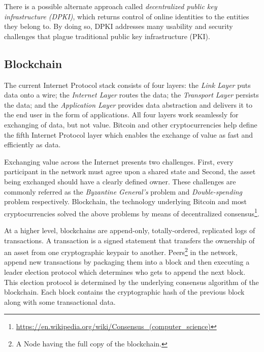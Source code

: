There is a possible alternate approach called \textit{decentralized public key infrastructure (DPKI)}, which returns control of online identities to the entities they belong to. By doing so, DPKI addresses many usability and security challenges that plague traditional public key infrastructure (PKI)\cite{allen2015decentralized}.

\subsection{Blockchain}
The current Internet Protocol stack consists of four layers: the \textit{Link Layer} puts data onto a wire; the \textit{Internet Layer} routes the data; the \textit{Transport Layer} persists the data; and the \textit{Application Layer} provides data abstraction and delivers it to the end user in the form of applications. All four layers work seamlessly for exchanging of data, but not value. Bitcoin\cite{nakamoto2008bitcoin} and other cryptocurrencies help define the fifth Internet Protocol layer which enables the exchange of value as fast and efficiently as data\cite{raval2016decentralized}.

Exchanging value across the Internet presents two challenges. First, every participant in the network must agree upon a shared state and Second, the asset being exchanged should have a clearly defined owner. These challenges are commonly referred as the \textit{Byzantine General's} problem\cite{lamport1982byzantine} and \textit{Double-spending} problem\cite{chohan2017double} respectively. Blockchain, the technology underlying Bitcoin and most cryptocurrencies solved the above problems by means of decentralized consensus\footnote{\url{https://en.wikipedia.org/wiki/Consensus_(computer_science)}}.

At a higher level, blockchains are append-only, totally-ordered, replicated logs of transactions\cite{bonneau2015research}. A transaction is a signed statement that transfers the ownership of an asset from one cryptographic keypair to another. Peers\footnote{A Node having the full copy of the blockchain.} in the network, append new transactions by packaging them into a block and then executing a leader election protocol which determines who gets to append the next block\cite{nelson2016extending}. This election protocol is determined by the underlying consensus algorithm of the blockchain. Each block contains the cryptographic hash of the previous block along with some transactional data.